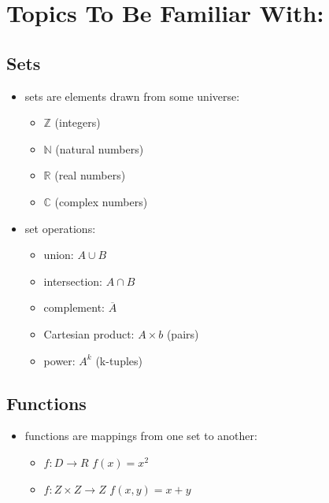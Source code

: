 \documentclass[11pt,a4paper]{article}
\begin{document}
\tableofcontents


\section{Topics To Be Familiar With:}
\subsection{Sets}
\begin{itemize}
    \item sets are elements drawn from some universe:
    \begin{itemize}
        \item $\mathbb{Z}$ (integers)
        \item $\mathbb{N}$ (natural numbers)
        \item $\mathbb{R}$ (real numbers)
        \item $\mathbb{C}$ (complex numbers)
    \end{itemize}
    \item set operations:
    \begin{itemize}
        \item union: $A \cup B$
        \item intersection: $A \cap B$
        \item complement: $\overline{A}$
        \item Cartesian product: $A \times b$ (pairs)
        \item power: $A^k$ (k-tuples)
    \end{itemize}
\end{itemize}

\subsection{Functions}
\begin{itemize}
    \item functions are mappings from one set to another:
    \begin{itemize}
        \item $f: D \rightarrow R$
        \subitem $f(x) = x^2$
        \item $f: Z \times Z \rightarrow Z $
        \subitem $f(x,y) = x + y$
    \end{itemize}
\end{itemize}
\end{document}
